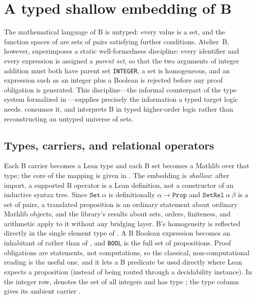 \section{A typed shallow embedding of B}
\label{sec:barrel-embedding}
\label{sec:embedding-b-lean}

The mathematical language of B is untyped: every value is a set, and the function spaces of
 are sets of pairs satisfying further conditions.
Atelier~B, however, superimposes a static well-formedness discipline: every identifier and
every expression is assigned a \emph{parent set}, so that the two arguments of integer
addition must both have parent set \texttt{INTEGER}, a set is homogeneous, and an
expression such as an integer plus a Boolean is rejected before any proof obligation is
generated.
This discipline---the informal counterpart of the type system formalized in
---supplies precisely the information a typed target logic needs.
\barrel{} consumes it, and interprets B in typed higher-order logic rather than
reconstructing an untyped universe of sets.

\subsection{Types, carriers, and relational operators}

Each B carrier becomes a Lean type and each B set becomes a Mathlib  over that
type; the core of the mapping is given in .
The embedding is \emph{shallow}: after import, a supported B operator is a Lean definition,
not a constructor of an inductive syntax tree.
Since \(\mathtt{Set}\ \alpha\) is definitionally \(\alpha \to \mathtt{Prop}\) and
\(\mathtt{SetRel}\ \alpha\ \beta\) is a set of pairs, a translated proposition is an
ordinary statement about ordinary Mathlib objects, and the library's results about sets,
orders, finiteness, and arithmetic apply to it without any bridging layer.
B's homogeneity is reflected directly in the single element type of .
A B Boolean expression becomes an inhabitant of  rather than of
, and \texttt{BOOL} is the full set of propositions.
Proof obligations are statements, not computations, so the classical, non-computational
reading is the useful one, and it lets a B predicate be used directly where Lean expects a
proposition (instead of being routed through a decidability instance).
In the integer row,  denotes the set of all integers and has type
; the type column gives its ambient carrier .

